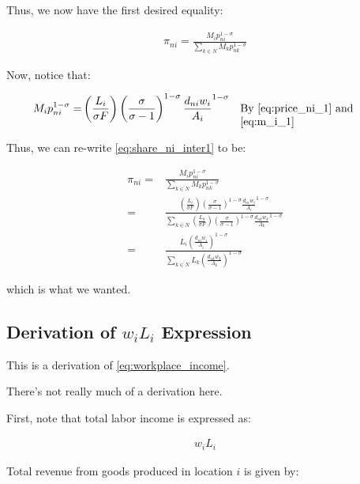 \documentclass[10pt]{article}
\begin{document}
Thus, we now have the first desired equality:

\begin{align}
    \pi_{n i}=\frac{M_i p_{n i}^{1-\sigma}}{\sum_{k \in N} M_k p_{n k}^{1-\sigma}} \label{eq:share_ni_inter1}
\end{align}

Now, notice that:

\begin{align}
    M_i p_{ni}^{1-\sigma} = &\left(\frac{L_i}{\sigma F}\right) \left(\frac{\sigma}{\sigma-1}\right)^{1-\sigma} \frac{d_{ni} w_i}{A_i}^{1-\sigma} && \parbox[t]{4cm}{\raggedright By \eqref{eq:price_ni_1} and \eqref{eq:m_i_1}}
\end{align}

Thus, we can re-write \eqref{eq:share_ni_inter1} to be: 

\begin{align}
    \pi_{n i}=&\frac{M_i p_{n i}^{1-\sigma}}{\sum_{k \in N} M_k p_{n k}^{1-\sigma}} \\
    = &\frac{\left(\frac{L_i}{\sigma F}\right) \left(\frac{\sigma}{\sigma-1}\right)^{1-\sigma} \frac{d_{ni} w_i}{A_i}^{1-\sigma}}{\sum_{k \in N} \left(\frac{L_k}{\sigma F}\right) \left(\frac{\sigma}{\sigma-1}\right)^{1-\sigma} \frac{d_{nk} w_k}{A_k}^{1-\sigma}} \\
    = &\frac{L_i \left(\frac{d_{ni} w_i}{A_i}\right)^{1-\sigma}}{\sum_{k \in N} L_k \left(\frac{d_{nk} w_k}{A_k}\right)^{1-\sigma}}
\end{align}

which is what we wanted.


\subsection{Derivation of $w_i L_i$ Expression}
\label{sec:workplace_income}

This is a derivation of \eqref{eq:workplace_income}.

There's not really much of a derivation here. 

First, note that total labor income is expressed as:

\begin{align}
    w_i L_i
\end{align}

Total revenue from goods produced in location $i$ is given by:
\end{document}
